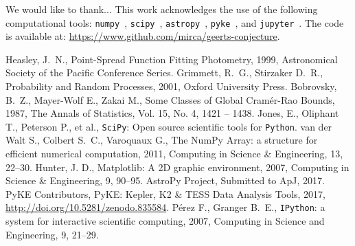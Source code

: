 \documentclass{rnaastex}
\begin{document}
\acknowledgments We would like to thank... This work acknowledges the use of the following computational tools: \texttt{numpy}~\citep{numpy}, \texttt{scipy}~\citep{scipy}, \texttt{astropy}~\citep{astropy}, \texttt{pyke}~\citep{pyke}, and \texttt{jupyter}~\citep{jupyter}.
The code is available at: \url{https://www.github.com/mirca/geerts-conjecture}.

\begin{thebibliography}{}
     Heasley, J.~N., Point-Spread Function Fitting Photometry, 1999, Astronomical Society of the Pacific Conference Series.
     Grimmett, R.~G., Stirzaker D.~R., Probability and Random Processes, 2001, Oxford University Press.
     Bobrovsky, B.~Z., Mayer-Wolf E., Zakai M., Some Classes of Global Cram\'er-Rao Bounds, 1987, The Annals of Statistics, Vol. 15, No. 4, 1421 -- 1438.
     Jones, E., Oliphant T., Peterson P., et al., \texttt{SciPy}: Open source scientific tools for \texttt{Python}.
     van der Walt S., Colbert S.~C., Varoquaux G., The NumPy Array: a structure for efficient numerical computation, 2011, Computing in Science \& Engineering, 13, 22--30.
     Hunter, J. D., Matplotlib: A 2D graphic environment, 2007, Computing in Science \& Engineering, 9, 90--95.
     AstroPy Project, Submitted to ApJ, 2017.
     PyKE Contributors, PyKE: Kepler, K2 \& TESS Data Analysis Tools, 2017, \url{http://doi.org/10.5281/zenodo.835584}.
     P\'erez F., Granger B.~E., \texttt{IPython}: a system for interactive scientific computing, 2007, Computing in Science and Engineering, 9, 21--29.
\end{thebibliography}
\end{document}
